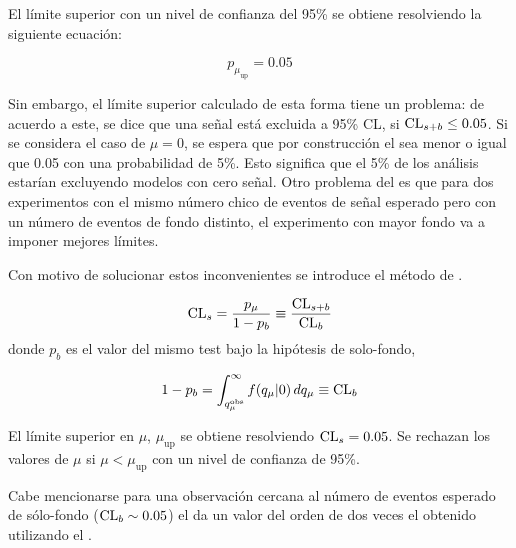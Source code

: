 El límite superior con un nivel de
confianza del 95\% se obtiene resolviendo la siguiente ecuación:

\begin{equation}
  p_{\mu_\text{up}} = 0.05
\end{equation}

Sin embargo, el límite superior calculado de esta forma tiene un problema: de
acuerdo a este, se dice que una señal está excluida a 95\% CL, si ${\mathrm{CL}_{s+b}} \leq
0.05$. Si se considera el caso de $\mu=0$, se espera que por construcción el
{\clsb} sea menor o igual que 0.05 con una probabilidad de 5\%. Esto significa
que el 5\% de los análisis estarían excluyendo modelos con cero señal. Otro
problema del {\clsb} es que para dos experimentos con el mismo número chico de
eventos de señal esperado pero con un número de eventos de fondo distinto, el
experimento con mayor fondo va a imponer mejores límites.

Con motivo de solucionar estos inconvenientes se introduce el método de {\cls}\cite{ReadCLs}.


\begin{equation}
  \mathrm{CL}_s = \frac{p_\mu}{1-p_b}  \equiv \frac{\mathrm{CL}_{s+b}}{\mathrm{CL}_b}
\end{equation}
%
donde $p_b$ es el valor del mismo test bajo la hipótesis de solo-fondo,

\begin{equation}
  1 - p_b = \int_{q_\mu^\text{obs}}^{\infty}
  f({q}_\mu|0) \, dq_\mu \equiv \mathrm{CL}_b
\end{equation}

El límite superior {\cls} en $\mu$, $\mu_\text{up}$ se obtiene resolviendo
$\mathrm{CL}_s = 0.05$. Se rechazan los valores de $\mu$ si $\mu <
\mu_\text{up}$ con un nivel de confianza de 95\%.

Cabe mencionarse para una observación cercana al número de eventos esperado de sólo-fondo ($\mathrm{CL}_b
\sim 0.05$) el {\cls} da un valor del orden de dos veces el obtenido utilizando
el {\clsb}.



